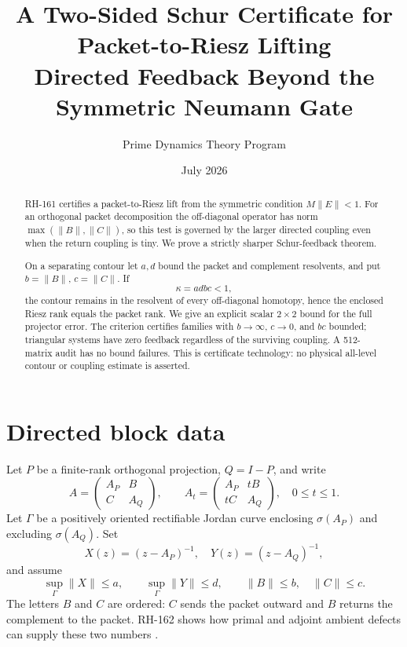 \documentclass[12pt]{article}
\title{A Two-Sided Schur Certificate for Packet-to-Riesz Lifting\\\large Directed Feedback Beyond the Symmetric Neumann Gate}
\author{Prime Dynamics Theory Program}
\date{July 2026}
\newcommand{\norm}[1]{\lVert#1\rVert}
\begin{document}
\maketitle
\begin{abstract}
RH-161 certifies a packet-to-Riesz lift from the symmetric condition
$M\norm E<1$.  For an orthogonal packet decomposition the off-diagonal
operator has norm $\max(\norm B,\norm C)$, so this test is governed by the
larger directed coupling even when the return coupling is tiny.  We prove a
strictly sharper Schur-feedback theorem.

On a separating contour let $a,d$ bound the packet and complement
resolvents, and put $b=\norm B$, $c=\norm C$.  If
\[
 \kappa=adbc<1,
\]
the contour remains in the resolvent of every off-diagonal homotopy, hence
the enclosed Riesz rank equals the packet rank.  We give an explicit scalar
$2\times2$ bound for the full projector error.  The criterion certifies
families with $b\to\infty$, $c\to0$, and $bc$ bounded; triangular systems
have zero feedback regardless of the surviving coupling.  A 512-matrix
audit has no bound failures.  This is certificate technology: no physical
all-level contour or coupling estimate is asserted.
\end{abstract}

\section{Directed block data}
Let $P$ be a finite-rank orthogonal projection, $Q=I-P$, and write
\[
 A=\begin{pmatrix}A_P&B\\ C&A_Q\end{pmatrix},\qquad
 A_t=\begin{pmatrix}A_P&tB\\ tC&A_Q\end{pmatrix},\quad0\le t\le1.
\]
Let $\Gamma$ be a positively oriented rectifiable Jordan curve enclosing
$\sigma(A_P)$ and excluding $\sigma(A_Q)$.  Set
\[
 X(z)=(z-A_P)^{-1},\quad Y(z)=(z-A_Q)^{-1},
\]
and assume
\[
 \sup_\Gamma\norm X\le a,\qquad
 \sup_\Gamma\norm Y\le d,
 \qquad\norm B\le b,\quad\norm C\le c.
\]
The letters $B$ and $C$ are ordered: $C$ sends the packet outward and $B$
returns the complement to the packet.  RH-162 shows how primal and adjoint
ambient defects can supply these two numbers \citep{WangRH162}.
\end{document}
